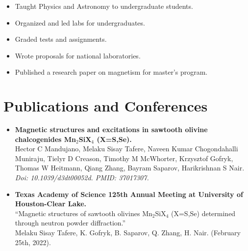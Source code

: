 \documentclass[11pt,a4paper]{article}
\begin{document}
\begin{itemize}[noitemsep, itemsep=4pt, leftmargin=*]

    \item Taught Physics and Astronomy to undergraduate students.

    \item Organized and led labs for undergraduates.

    \item Graded tests and assignments.

    \item Wrote proposals for national laboratories.

    \item Published a research paper on magnetism for master's program.

\end{itemize}




\section*{\textbf{Publications and Conferences}}

\begin{itemize}[leftmargin=*]

    \item \textbf{Magnetic structures and excitations in sawtooth olivine chalcogenides Mn$_2$SiX$_4$ (X=S,Se).} \\

    Hector C Mandujano, Melaku Sisay Tafere, Naveen Kumar Chogondahalli Muniraju, Tielyr D Creason, Timothy M McWhorter, Krzysztof Gofryk, Thomas W Heitmann, Qiang Zhang, Bayram Saparov, Harikrishnan S Nair. \\

    \textit{Doi: 10.1039/d3dt00052d. PMID: 37017307.}

    

    \item \textbf{Texas Academy of Science 125th Annual Meeting at University of Houston-Clear Lake.} \\

    ``Magnetic structures of sawtooth olivines Mn$_2$SiX$_4$ (X=S,Se) determined through neutron powder diffraction.'' \\

    Melaku Sisay Tafere, K. Gofryk, B. Saparov, Q. Zhang, H. Nair. (February 25th, 2022).

\end{itemize}
\end{document}
